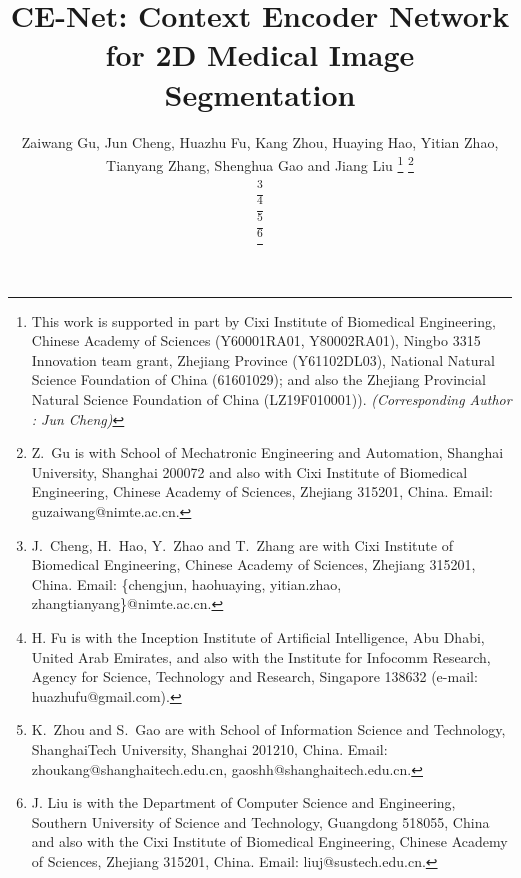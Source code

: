 \documentclass[journal]{IEEEtran}
\begin{document}
\title{CE-Net: Context Encoder Network for 2D Medical  Image Segmentation}

\author{Zaiwang Gu, Jun Cheng, Huazhu Fu, Kang Zhou, Huaying Hao, Yitian Zhao, Tianyang Zhang, Shenghua Gao and Jiang Liu
\thanks{This work is supported in part by Cixi Institute of Biomedical Engineering, Chinese Academy of Sciences (Y60001RA01, Y80002RA01), Ningbo 3315 Innovation team grant, Zhejiang Province (Y61102DL03),  National Natural Science Foundation of China (61601029); and also the Zhejiang Provincial Natural Science Foundation of China (LZ19F010001)). \it{(Corresponding Author : Jun Cheng)}}
\thanks{Z.~Gu is with School of Mechatronic Engineering and Automation, Shanghai University, Shanghai 200072 and also with Cixi Institute of Biomedical Engineering, Chinese Academy of Sciences, Zhejiang 315201, China. Email: guzaiwang@nimte.ac.cn.}

\thanks{J.~Cheng,  H.~Hao, Y.~Zhao and T.~Zhang are with Cixi Institute of Biomedical Engineering, Chinese Academy of Sciences, Zhejiang 315201, China. Email: \{chengjun, haohuaying, yitian.zhao, zhangtianyang\}@nimte.ac.cn.}

\thanks{H. Fu is with the Inception Institute of Artiﬁcial Intelligence, Abu Dhabi, United Arab Emirates, and also with the Institute for Infocomm Research, Agency for Science, Technology and Research, Singapore 138632 (e-mail: huazhufu@gmail.com).}

\thanks{K.~Zhou and S.~Gao are  with School of Information Science and Technology, ShanghaiTech University, Shanghai 201210, China. Email: zhoukang@shanghaitech.edu.cn, gaoshh@shanghaitech.edu.cn.}

\thanks{J. Liu is  with the Department
of Computer Science and Engineering, Southern University of Science and
Technology, Guangdong 518055, China and also with the Cixi Institute of Biomedical Engineering, Chinese Academy of Sciences, Zhejiang 315201, China. Email: liuj@sustech.edu.cn.}



}

\maketitle
\end{document}
